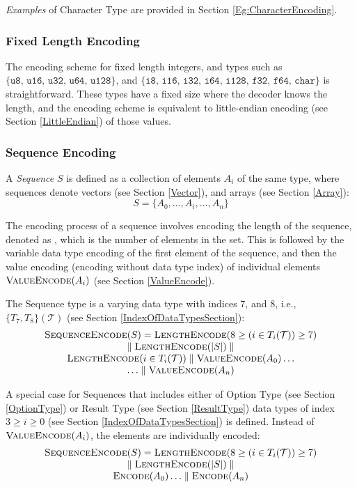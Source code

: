 \documentclass[../alan-handbook.tex]{subfiles}
\begin{document}
\textit{Examples} of Character Type are provided in Section \ref{Eg:CharacterEncoding}.

\subsubsection{Fixed Length Encoding} 
\label{FixedLengthEncoding}

The encoding scheme for fixed length integers, and types such as $\{\texttt{u8, u16, u32, u64, u128}\}$, and $\{\texttt{i8, i16, i32, i64, i128, f32, f64, char}\}$ is straightforward. These types have a fixed size where the decoder knows the length, and the encoding scheme is equivalent to little-endian encoding (see Section \ref{LittleEndian}) of those values.

\subsubsection{Sequence Encoding} 
\label{SequenceEncoding}

A \textit{Sequence} $S$ is defined as a collection of elements $A_i$ of the same type, where sequences denote vectors (see Section \ref{Vector}), and arrays (see Section \ref{Array}):
$$S = \{A_0, \ldots, A_i, \ldots, A_n\}$$

The encoding process of a sequence involves encoding the length of the sequence, denoted as , which is the number of elements in the set. This is followed by the variable data type encoding of the first element of the sequence, and then the value encoding (encoding without data type index) of individual elements $\Call{ValueEncode}{A_i}$ (see Section \ref{ValueEncode}).

The Sequence type is a varying data type with indices $7$, and $8$, i.e., $\{T_7, T_8\}(\mathcal{T})$ (see Section \ref{IndexOfDataTypesSection}):
$$
\begin{matrix}
    \Call{SequenceEncode}{S} = \Call{LengthEncode}{8 \geq (i \in T_i(\mathcal{T})) \geq 7} \\
    \parallel \Call{LengthEncode}{\lvert S \rvert} \parallel \\
    \Call{LengthEncode}{i \in T_i(\mathcal{T})} \parallel \Call{ValueEncode}{A_0} \ldots \\ 
    \ldots \parallel \Call{ValueEncode}{A_n}
\end{matrix}
$$

A special case for Sequences that includes either of Option Type (see Section \ref{OptionType}) or Result Type (see Section \ref{ResultType}) data types of index $3 \geq i \geq 0$ (see Section \ref{IndexOfDataTypesSection}) is defined. Instead of $\Call{ValueEncode}{A_i}$, the elements are individually encoded:
$$
\begin{matrix}
    \Call{SequenceEncode}{S} = \Call{LengthEncode}{8 \geq (i \in T_i(\mathcal{T})) \geq 7} \\
    \parallel \Call{LengthEncode}{\lvert S \rvert} \parallel \\
    \Call{Encode}{A_0} \ldots \parallel \Call{Encode}{A_n}
\end{matrix}
$$
\end{document}
